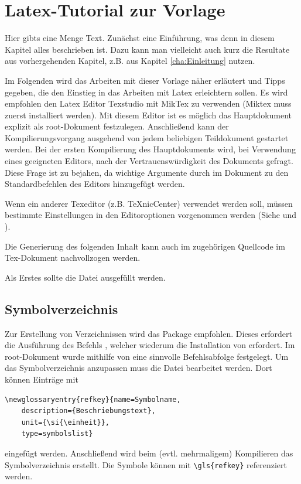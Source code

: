 \chapter{Latex-Tutorial zur Vorlage}
\label{cha:BspInhalt}
Hier gibts eine Menge Text. Zunächst eine Einführung, was denn in diesem Kapitel alles beschrieben ist. Dazu kann man vielleicht auch kurz die Resultate aus vorhergehenden Kapitel, z.B. aus Kapitel \ref{cha:Einleitung} nutzen.

Im Folgenden wird das Arbeiten mit dieser Vorlage näher erläutert und Tipps gegeben, die den Einstieg in das Arbeiten mit Latex erleichtern sollen. Es wird empfohlen den Latex Editor Texstudio mit MikTex zu verwenden (Miktex muss zuerst installiert werden). Mit diesem Editor ist es möglich das Hauptdokument  explizit als root-Dokument festzulegen. Anschließend kann der Kompilierungsvorgang ausgehend von jedem beliebigen Teildokument gestartet werden. Bei der ersten Kompilierung des Hauptdokuments wird, bei Verwendung eines geeigneten Editors, nach der Vertrauenswürdigkeit des Dokuments gefragt. Diese Frage ist zu bejahen, da wichtige Argumente durch  im Dokument  zu den Standardbefehlen des Editors hinzugefügt werden. 

Wenn ein anderer Texeditor (z.B. TeXnicCenter) verwendet werden soll, müssen bestimmte Einstellungen in den Editoroptionen vorgenommen werden (Siehe \cite{schubert.2014} und \cite{kurt.2014}).

Die Generierung des folgenden Inhalt kann auch im zugehörigen Quellcode im Tex-Dokument nachvollzogen werden.

Als Erstes sollte die Datei  ausgefüllt werden.

\section{Symbolverzeichnis}\label{subsec:notation}
Zur Erstellung von Verzeichnissen wird das  Package empfohlen. Dieses erfordert die Ausführung des Befehls , welcher wiederum die Installation von  erfordert. Im root-Dokument wurde mithilfe von  eine sinnvolle Befehlsabfolge festgelegt. Um das Symbolverzeichnis anzupassen muss die Datei  bearbeitet werden. Dort können Einträge mit
\begin{lstlisting}[style=myLatexStyle]
	\newglossaryentry{refkey}{name=Symbolname,
	description={Beschriebungstext},
	unit={\si{\einheit}},
	type=symbolslist}	
	\end{lstlisting}
eingefügt werden.
Anschließend wird beim (evtl. mehrmaligem) Kompilieren das Symbolverzeichnis erstellt. Die Symbole können mit  
\lstinline|\gls{refkey}| referenziert werden.
